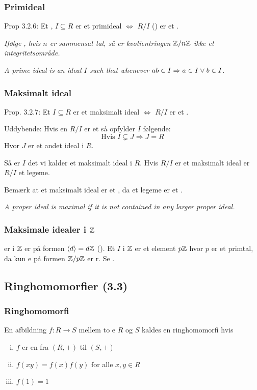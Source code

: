 \subsubsection{Primideal}
\label{Primideal}
Prop 3.2.6: Et , $I \subseteq R$ er et primideal $\iff$
$R/I$ () er et .

\textit{Ifølge , hvis $n$ er sammensat tal, så er
kvotientringen $\mathbb{Z}/n\mathbb{Z}$ ikke et integritetsområde.}

\textit{A prime ideal is an ideal $I$ such that whenever $ab \in I \Rightarrow
a \in I \vee b \in I$.}

\subsubsection{Maksimalt ideal}
\label{Maksimalt ideal}
Prop. 3.2.7: Et  $I \subseteq R$ er et maksimalt ideal $\iff$
$R/I$ er et .

Uddybende: Hvis en $R/I$ er et  så
opfylder $I$ følgende:
\begin{equation*}
  \text{Hvis } I \subsetneq J \Rightarrow J = R
\end{equation*}
Hvor $J$ er et andet ideal i $R$.

Så er $I$ det vi kalder et maksimalt ideal i $R$. Hvis $R/I$ er et maksimalt
ideal er $R/I$ et legeme.

Bemærk at et maksimalt ideal er et , da et legeme er et
.

\textit{A proper ideal is maximal if it is not contained in any larger proper
ideal.}

\subsubsection{Maksimale idealer i $\mathbb{Z}$}
\label{Maksimale idealer i Z}
er i $\mathbb{Z}$ er på formen $\langle d \rangle = d\mathbb{Z}$
(). Et  $I$ i $\mathbb{Z}$ er et
element $p\mathbb{Z}$ hvor $p$ er et primtal, da kun e på
formen $\mathbb{Z}/p\mathbb{Z}$ er r. Se .


\subsection{Ringhomomorfier (3.3)}
\subsubsection{Ringhomomorfi}
\label{Ringhomomorfi}
En afbildning $f: R \rightarrow S$ mellem to e $R$ og $S$ kaldes
en ringhomomorfi hvis
\begin{enumerate}[(i)]
  \item $f$ er en  fra $(R, +)$ til $(S,+)$
  \item $f(xy) = f(x)f(y)$ for alle $x,y \in R$
  \item $f(1) = 1$
\end{enumerate}

